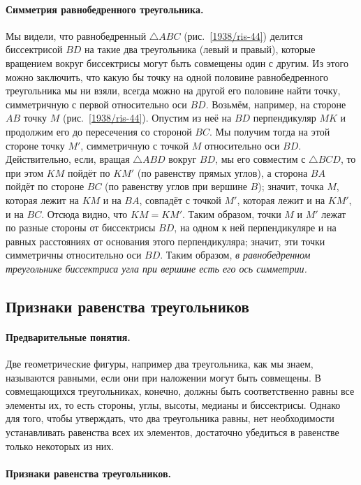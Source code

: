 \paragraph{Симметрия равнобедренного треугольника.}\label{1938/40}
Мы видели, что равнобедренный $\triangle ABC$ (рис.~\ref{1938/ris-44}) делится биссектрисой $BD$ на такие два треугольника (левый и правый), которые вращением вокруг биссектрисы могут быть совмещены один с другим.
Из этого можно заключить, что какую бы точку на одной половине равнобедренного треугольника мы ни взяли, всегда можно на другой его половине найти точку, симметричную с первой относительно оси $BD$.
Возьмём, например, на стороне $AB$ точку $M$ (рис.~\ref{1938/ris-44}).
Опустим из неё на $BD$ перпендикуляр $MK$ и продолжим его до пересечения со стороной $BC$.
Мы получим тогда на этой стороне точку $M'$, симметричную с точкой $M$ относительно оси $BD$.
Действительно, если, вращая $\triangle ABD$ вокруг $BD$, мы его совместим с $\triangle BCD$, то при этом $KM$ пойдёт по $KM'$ (по равенству прямых углов), а сторона $BA$ пойдёт по стороне $BC$ (по равенству углов при вершине $B$);
значит, точка $M$, которая лежит на $KM$ и на $BA$, совпадёт с точкой $M'$, которая лежит и на $KM'$, и на $BC$.
Отсюда видно, что $KM=KM'$.
Таким образом, точки $M$ и $M'$ лежат по разные стороны от биссектрисы $BD$, на одном к ней перпендикуляре и на равных расстояниях от основания этого перпендикуляра;
значит, эти точки симметричны относительно оси $BD$.
Таким образом, \emph{в равнобедренном треугольнике биссектриса угла при вершине есть его ось симметрии.}


\subsection*{Признаки равенства треугольников}

\paragraph{Предварительные понятия.}\label{1938/41}
Две геометрические фигуры, например два треугольника, как мы знаем, называются равными, если они при наложении могут быть совмещены.
В совмещающихся треугольниках, конечно, должны быть соответственно равны все элементы их, то есть стороны, углы, высоты, медианы и биссектрисы.
Однако для того, чтобы утверждать, что два треугольника равны, нет необходимости устанавливать равенства всех их элементов, достаточно убедиться в равенстве только некоторых из них.


\paragraph{Признаки равенства треугольников.}\label{1938/42}\ 

